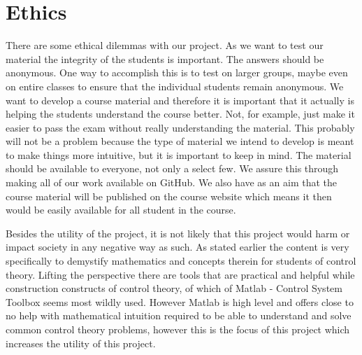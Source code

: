 \section{Ethics}
There are some ethical dilemmas with our project. As we want to test our material the integrity of the students is important. The answers should be anonymous. One way to accomplish this is to test on larger groups, maybe even on entire classes to ensure that the individual students remain anonymous. We want to develop a course material and therefore it is important that it actually is helping the students understand the course better. Not, for example, just make it easier to pass the exam without really understanding the material. This probably will not be a problem because the type of material we intend to develop is meant to make things more intuitive, but it is important to keep in mind. The material should be available to everyone, not only a select few. We assure this through making all of our work available on GitHub. We also have as an aim that the course material will be published on the course website which means it then would be easily available for all student in the course.

Besides the utility of the project, it is not likely that this project would harm or impact society in any negative way as such. As stated earlier the content is very specifically to demystify mathematics and concepts therein for students of control theory. Lifting the perspective there are tools that are practical and helpful while construction constructs of control theory, of which of Matlab - Control System Toolbox \cite{matlab_control} seems most wildly used. However Matlab is high level and offers close to no help with mathematical intuition required to be able to understand and solve common control theory problems, however this is the focus of this project which increases the utility of this project. 




\iffalse

Samhälleliga och etiska aspekter
•  Bedömning av om samhälleliga och etiska aspekter behöver beaktas och analyseras vidare i uppsatsen/rapporten. 
•  Om svaret är nej skall detta motiveras.
•  Se bilaga 7 –Beslutsanalysmodell: 5 frågor
•  Se de digitala resurser som finns på Studentportalens sidor om kandidatarbetet.


\fi
